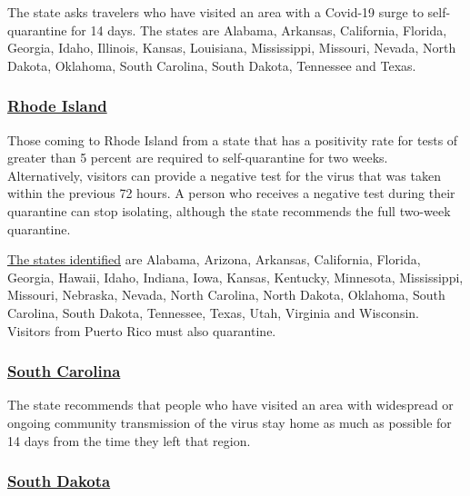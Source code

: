 The state asks travelers who have visited an area with a Covid-19 surge
to self-quarantine for 14 days. The states are Alabama, Arkansas,
California, Florida, Georgia, Idaho, Illinois, Kansas, Louisiana,
Mississippi, Missouri, Nevada, North Dakota, Oklahoma, South Carolina,
South Dakota, Tennessee and Texas.

\hypertarget{rhode-island}{%
\subsubsection{\texorpdfstring{\href{https://health.ri.gov/covid/}{Rhode
Island}}{Rhode Island}}\label{rhode-island}}

Those coming to Rhode Island from a state that has a positivity rate for
tests of greater than 5 percent are required to self-quarantine for two
weeks. Alternatively, visitors can provide a negative test for the virus
that was taken within the previous 72 hours. A person who receives a
negative test during their quarantine can stop isolating, although the
state recommends the full two-week quarantine.

\href{https://docs.google.com/spreadsheets/d/e/2PACX-1vSUCk9FlHBoJt5ZO0U6PKTTY7jHH8V4MovED0WiqpTTixdgMSCnUWI25xX5DCmQmtLknzu7Bo0jwY02/pubhtml?gid=0\&single=true}{The
states identified} are Alabama, Arizona, Arkansas, California, Florida,
Georgia, Hawaii, Idaho, Indiana, Iowa, Kansas, Kentucky, Minnesota,
Mississippi, Missouri, Nebraska, Nevada, North Carolina, North Dakota,
Oklahoma, South Carolina, South Dakota, Tennessee, Texas, Utah, Virginia
and Wisconsin. Visitors from Puerto Rico must also quarantine.

\hypertarget{south-carolina}{%
\subsubsection{\texorpdfstring{\href{https://scdhec.gov/infectious-diseases/viruses/coronavirus-disease-2019-covid-19/travelers-covid-19}{South
Carolina}}{South Carolina}}\label{south-carolina}}

The state recommends that people who have visited an area with
widespread or ongoing community transmission of the virus stay home as
much as possible for 14 days from the time they left that region.

\hypertarget{south-dakota}{%
\subsubsection{\texorpdfstring{\href{https://www.travelsouthdakota.com/coronavirus-covid-19}{South
Dakota}}{South Dakota}}\label{south-dakota}}

